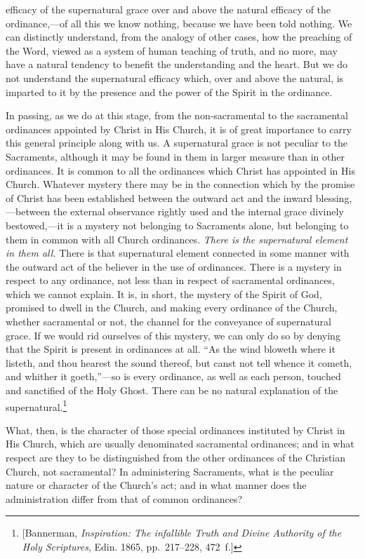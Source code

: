 \documentclass[
]{book}
\begin{document}
efficacy of the supernatural grace over and above the natural efficacy of the ordinance,---of all this we know nothing, because we have been told nothing. We can distinctly understand, from the analogy of other cases, how the preaching of the Word, viewed as a system of human teaching of truth, and no more, may have a natural tendency to benefit the understanding and the heart. But we do not understand the supernatural efficacy which, over and above the natural, is imparted to it by the presence and the power of the Spirit in the ordinance.

In passing, as we do at this stage, from the non-sacramental to the sacramental ordinances appointed by Christ in His Church, it is of great importance to carry this general principle along with us. A supernatural grace is not peculiar to the Sacraments, although it may be found in them in larger measure than in other ordinances. It is common to all the ordinances which Christ has appointed in His Church. Whatever mystery there may be in the connection which by the promise of Christ has been established between the outward act and the inward blessing,---between the external observance rightly used and the internal grace divinely bestowed,---it is a mystery not belonging to Sacraments alone, but belonging to them in common with all Church ordinances. \emph{There is the supernatural element in them all.} There is that supernatural element connected in some manner with the outward act of the believer in the use of ordinances. There is a mystery in respect to any ordinance, not less than in respect of sacramental ordinances, which we cannot explain. It is, in short, the mystery of the Spirit of God, promised to dwell in the Church, and making every ordinance of the Church, whether sacramental or not, the channel for the conveyance of supernatural grace. If we would rid ourselves of this mystery, we can only do so by denying that the Spirit is present in ordinances at all. ``As the wind bloweth where it listeth, and thou hearest the sound thereof, but canst not tell whence it cometh, and whither it goeth,''---so is every ordinance, as well as each person, touched and sanctified of the Holy Ghost. There can be no natural explanation of the supernatural.\footnote{{[}Bannerman, \emph{Inspiration: The infallible Truth and Divine Authority of the Holy Scriptures}, Edin. 1865, pp.~217--228, 472~f.{]}}

What, then, is the character of those special ordinances instituted by Christ in His Church, which are usually denominated sacramental ordinances; and in what respect are they to be distinguished from the other ordinances of the Christian Church, not sacramental? In administering Sacraments, what is the peculiar nature or character of the Church's act; and in what manner does the administration differ from that of common ordinances?
\end{document}
